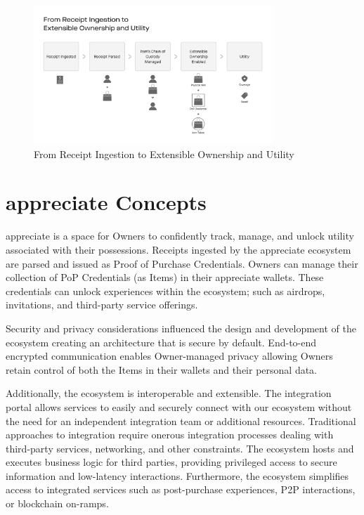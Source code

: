 \documentclass[a4paper,onecolumn, 10.5pt]{article}
\begin{document}
\begin{figure}[!htb]
	\centering %
		\includegraphics[clip, trim=0cm 2cm 0cm 7.5cm, width=0.80\textwidth]{./images/flowchart.pdf}
	\caption{From Receipt Ingestion to Extensible Ownership and Utility  }
	\label{fig: flowchart}
\end{figure}



\section {appreciate Concepts}

\begin{tcolorbox}[colback=gray!5!white,colframe=gray!50!black, title=appreciate experience for Item Owners]	
	appreciate is a space for Owners to confidently track, manage, and unlock utility associated with their possessions.  Receipts ingested by the appreciate ecosystem are parsed and issued as Proof of Purchase Credentials.  Owners can manage their collection of PoP Credentials (as Items) in their appreciate wallets. These credentials can unlock experiences within the ecosystem; such as airdrops, invitations, and third-party service offerings. 
\end{tcolorbox}


Security and privacy considerations influenced the design and development of the ecosystem creating an architecture that is secure by default. End-to-end encrypted communication enables Owner-managed privacy allowing Owners retain control of both the Items in their wallets and their personal data.

Additionally, the ecosystem is interoperable and extensible. The integration portal allows services to easily and securely connect with our ecosystem without the need for an independent integration team or additional resources. Traditional approaches to integration require onerous integration processes dealing with third-party services, networking, and other constraints. The ecosystem hosts and executes business logic for third parties, providing privileged access to secure information and low-latency interactions. Furthermore, the ecosystem simplifies access to integrated services such as post-purchase experiences, P2P interactions, or blockchain on-ramps. 
\end{document}
